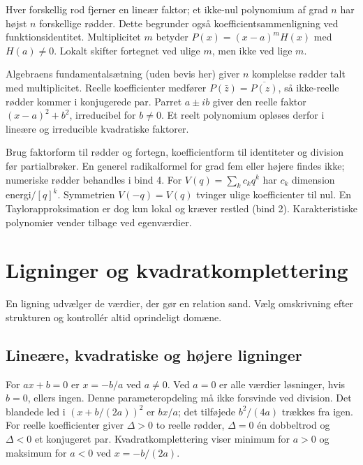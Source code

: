 Hver forskellig rod fjerner en lineær faktor; et ikke-nul polynomium af
grad $n$ har højst $n$ forskellige rødder. Dette begrunder også
koefficientsammenligning ved funktionsidentitet. Multiplicitet $m$ betyder
$P(x)=(x-a)^mH(x)$ med $H(a)\ne0$. Lokalt skifter fortegnet ved ulige
$m$, men ikke ved lige $m$.



Algebraens fundamentalsætning (uden bevis her) giver $n$ komplekse rødder
talt med multiplicitet. Reelle koefficienter medfører
$P(\bar z)=\overline{P(z)}$, så ikke-reelle rødder kommer i konjugerede par.
Parret $a\pm ib$ giver den reelle faktor $(x-a)^2+b^2$, irreducibel for
$b\ne0$. Et reelt polynomium opløses derfor i lineære og irreducible
kvadratiske faktorer.

Brug faktorform til rødder og fortegn, koefficientform til identiteter og
division før partialbrøker. En generel radikalformel for grad fem eller
højere findes ikke; numeriske rødder behandles i bind 4.
For $V(q)=\sum_k c_kq^k$ har $c_k$ dimension energi$/[q]^k$.
Symmetrien $V(-q)=V(q)$ tvinger ulige koefficienter til nul.
En Taylorapproksimation er dog kun lokal og kræver restled (bind 2).
Karakteristiske polynomier vender tilbage ved egenværdier.

\section{Ligninger og kvadratkomplettering}
\label{sec:b1-ligninger}
En ligning udvælger de værdier, der gør en relation sand.
Vælg omskrivning efter strukturen og kontrollér altid oprindeligt domæne.
\subsection{Lineære, kvadratiske og højere ligninger}
For $ax+b=0$ er $x=-b/a$ ved $a\ne0$. Ved $a=0$ er alle værdier
løsninger, hvis $b=0$, ellers ingen. Denne parameteropdeling må ikke
forsvinde ved division.
Det blandede led i $(x+b/(2a))^2$ er $bx/a$; det tilføjede
$b^2/(4a)$ trækkes fra igen. For reelle koefficienter giver
$\Delta>0$ to reelle rødder, $\Delta=0$ én dobbeltrod og $\Delta<0$
et konjugeret par. Kvadratkomplettering viser minimum for $a>0$ og
maksimum for $a<0$ ved $x=-b/(2a)$.

